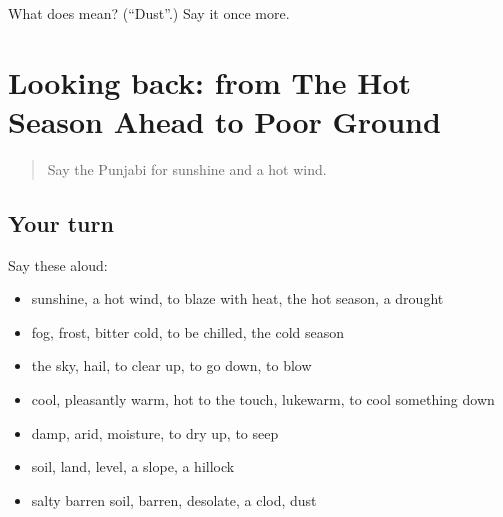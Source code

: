 \begin{tcolorbox}[breakable,colback=teal!4,colframe=teal!35!black,title={Before you move on}]
What does  mean? (\textquotedblleft{}Dust\textquotedblright{}.) Say it once more.
\end{tcolorbox}
\section[(dialogue)]{Looking back: from The Hot Season Ahead to Poor Ground}

\label{lesson:PA-R294-review-288-294}



\begin{quote}
Say the Punjabi for sunshine and a hot wind.
\end{quote}

\subsection*{Your turn}
Say these aloud:

\begin{itemize}
\raggedright
  \item sunshine, a hot wind, to blaze with heat, the hot season, a drought
  \item fog, frost, bitter cold, to be chilled, the cold season
  \item the sky, hail, to clear up, to go down, to blow
  \item cool, pleasantly warm, hot to the touch, lukewarm, to cool something down
  \item damp, arid, moisture, to dry up, to seep
  \item soil, land, level, a slope, a hillock
  \item salty barren soil, barren, desolate, a clod, dust
\end{itemize}

